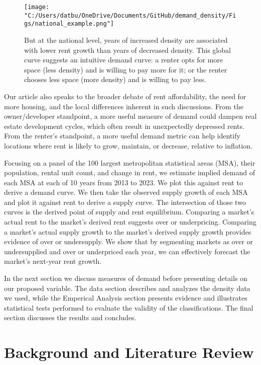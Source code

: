 \documentclass[sn-mathphys-num]{sn-jnl}%
\theoremstyle{thmstyleone}%
\theoremstyle{thmstyletwo}%
\theoremstyle{thmstylethree}%
\begin{document}
\begin{figure}[H]
	\centering
	\texttt{[image: "C:/Users/datbu/OneDrive/Documents/GitHub/demand\_density/Figs/national\_example.png"]}
	\caption{But at the national level, years of increased density are associated with lower rent growth than years of decreased density. This global curve suggests an intuitive demand curve: a renter opts for more space (less density) and is willing to pay more for it; or the renter chooses less space (more density) and is willing to pay less.}\label{fig4}
\end{figure}

Our article also speaks to the broader debate of rent affordability, the need for more housing, and the local differences inherent in such discussions. From the owner/developer standpoint, a more useful measure of demand could dampen real estate development cycles, which often result in unexpectedly depressed rents. From the renter's standpoint, a more useful demand metric can help identify locations where rent is likely to grow, maintain, or decrease, relative to inflation.  

Focusing on a panel of the 100 largest metropolitan statistical areas (MSA), their population, rental unit count, and change in rent, we estimate implied demand of each MSA at each of 10 years from 2013 to 2023. We plot this against rent to derive a demand curve. We then take the observed supply growth of each MSA and plot it against rent to derive a supply curve. The intersection of those two curves is the derived point of supply and rent equilibrium. Comparing a market's actual rent to the market's derived rent suggests over or underpricing. Comparing a market's actual supply growth to the market's derived supply growth provides evidence of over or undersupply. We show that by segmenting markets as over or undersupplied and over or underpriced each year, we can effectively forecast the market's next-year rent growth.  

In the next section we discuss measures of demand before presenting details on our proposed variable. The data section describes and analyzes the density data we used, while the Emperical Analysis section presents evidence and illustrates statistical tests performed to evaluate the validity of the classifications. The final section discusses the results and concludes. 

\section{Background and Literature Review}
\end{document}
